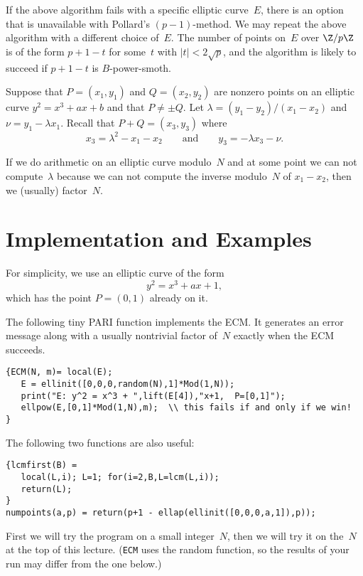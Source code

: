 \documentclass[11pt]{report}
\begin{document}
If the above algorithm fails with a specific elliptic curve~$E$, there
is an option that is unavailable with Pollard's $(p-1)$-method.  We may
repeat the above algorithm with a different choice of~$E$.  The number
of points on~$E$ over $\Z/p\Z$ is of the form $p+1-t$ for some~$t$
with $|t|<2\sqrt{p}$, and the algorithm is likely to succeed if
$p+1-t$ is $B$-power-smoth.

Suppose that $P=(x_1,y_1)$ and $Q=(x_2,y_2)$ are nonzero points
on an elliptic curve $y^2 = x^3 + ax + b$ and that $P\neq \pm Q$.
Let $\lambda = (y_1-y_2)/(x_1-x_2)$ and
$\nu = y_1 - \lambda x_1$.
Recall that $P+Q = (x_3,y_3)$ where
$$x_3 = \lambda^2 -x_1 - x_2\qquad\text{and}\qquad
  y_3 = -\lambda x_3 - \nu.$$

If we do arithmetic on an elliptic curve modulo~$N$ and at some point
we can not compute~$\lambda$ because we can not compute the inverse
modulo~$N$ of $x_1-x_2$, then we (usually) factor~$N$.

\section{Implementation and Examples}
For simplicity, we use an elliptic curve
of the form
$$y^2 = x^3 + ax + 1,$$
which has the point $P=(0,1)$ already on it.

The following tiny PARI function implements the ECM.  It
generates an error message along with a usually nontrivial factor of~$N$
exactly when the ECM succeeds.
\begin{verbatim}
{ECM(N, m)= local(E);
   E = ellinit([0,0,0,random(N),1]*Mod(1,N));
   print("E: y^2 = x^3 + ",lift(E[4]),"x+1,  P=[0,1]");
   ellpow(E,[0,1]*Mod(1,N),m);  \\ this fails if and only if we win!
}
\end{verbatim}
The following two functions are also useful:
\begin{verbatim}
{lcmfirst(B) =  
   local(L,i); L=1; for(i=2,B,L=lcm(L,i));
   return(L);
}
numpoints(a,p) = return(p+1 - ellap(ellinit([0,0,0,a,1]),p));
\end{verbatim}

First we will try the program on a small integer~$N$, then we will try
it on the~$N$ at the top of this lecture.  ({\tt ECM} uses the random
function, so the results of your run may differ from the one below.)
\end{document}
